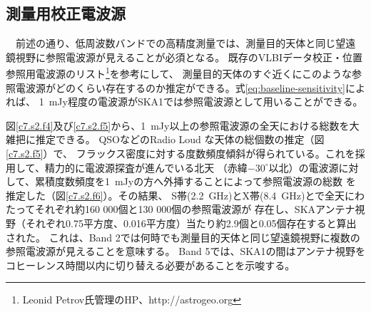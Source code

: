 \setcounter{subsection}{4}\subsection{測量用校正電波源}\label{c7.s2.ss5}

　前述の通り、低周波数バンドでの高精度測量では、測量目的天体と同じ望遠鏡視野に参照電波源が見えることが必須となる。
既存のVLBIデータ校正・位置参照用電波源のリスト\footnote{Leonid Petrov氏管理のHP、http://astrogeo.org}を参考にして、
測量目的天体のすぐ近くにこのような参照電波源がどのくらい存在するのか推定ができる。式\ref{eq:baseline-sensitivity}によれば、
1~mJy程度の電波源がSKA1では参照電波源として用いることができる。

図\ref{c7.s2.f4}及び\ref{c7.s2.f5}から、1~mJy以上の参照電波源の全天における総数を大雑把に推定できる。
QSOなどのRadio Loud な天体の総個数の推定\citet{SKA135}（図\ref{c7.s2.f5}）で、
フラックス密度に対する度数頻度傾斜が得られている。これを採用して、精力的に電波源探査が進んでいる北天
（赤緯$-30^{\circ}$以北）の電波源に対して、累積度数頻度を1~mJyの方へ外挿することによって参照電波源の総数
を推定した（図\ref{c7.s2.f6}）。その結果、
S帯(2.2~GHz)とX帯(8.4~GHz)とで全天にわたってそれぞれ約160 000個と130 000個の参照電波源が
存在し、SKAアンテナ視野（それぞれ0.75平方度、0.016平方度）当たり約2.9個と0.05個存在すると算出された。
これは、Band 2では何時でも測量目的天体と同じ望遠鏡視野に複数の参照電波源が見えることを意味する。
Band 5では、SKA1の間はアンテナ視野をコヒーレンス時間以内に切り替える必要があることを示唆する。

